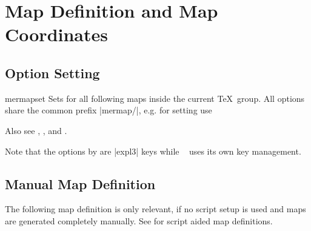 \clearpage
\section{Map Definition and Map Coordinates}\label{sec:map_definition}%

%
\begin{dispExample}
\end{dispExample}

\subsection{Option Setting}
\begin{docCommand}{mermapset}{}
  Sets  for all following maps inside the current \TeX\ group.
  All options share the common prefix |mermap/|, e.g. for setting
   use
  \begin{dispListing}
  \end{dispListing}
  Also see  , ,
  and .\par
  Note that the options by  are |expl3| \cite{l3kernel:interfaces}
  keys while \tikzname\ \cite{package:tikz} uses its own key management.
\end{docCommand}


\clearpage
\subsection{Manual Map Definition}
The following map definition is only relevant, if no script setup is used
and maps are generated completely manually.
See  for script aided map definitions.

